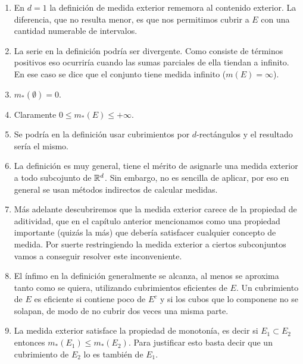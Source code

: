  \begin{observacion}{}
 \begin{enumerate}

 \item En $d=1$ la definición de medida exterior rememora al contenido exterior.   La diferencia, que no resulta menor, es que nos permitimos cubrir a $E$ con  una cantidad numerable de intervalos.
 \item La serie  en la definición podría  ser divergente. Como consiste de términos positivos eso ocurriría cuando las sumas parciales de ella tiendan a infinito. En ese caso se dice que el conjunto tiene medida infinito ($m(E)=\infty$).
 \item $m_*(\emptyset)=0$. 
 \item Claramente $0\leq m_{*}(E)\leq +\infty$. 
     \item Se podría en la definición usar cubrimientos por $d$-rectángulos  y el resultado sería el mismo.
     \item La definición es muy general, tiene el mérito  de asignarle una medida exterior a todo subcojunto de $\mathbb{R}^d$. Sin embargo, no es sencilla de aplicar, por eso en general se usan métodos indirectos de calcular medidas.
     \item Más adelante descubriremos que la medida exterior carece de la  propiedad de aditividad, que en el capítulo anterior mencionamos como una propiedad importante (quizás la más) que debería satisfacer cualquier concepto de medida. Por suerte restringiendo la medida exterior a ciertos subconjuntos vamos a conseguir resolver este inconveniente.
     \item El ínfimo en la definición generalmente se alcanza, al menos se aproxima tanto como se quiera, utilizando cubrimientos eficientes de $E$.  Un cubrimiento de $E$   es eficiente  si contiene poco de $E^c$ y si los cubos que lo componene no se solapan, de modo de no cubrir dos veces una misma parte.
     \item La medida exterior satisface la propiedad de monotonía, es decir si $E_1\subset E_2$ entonces $m_*(E_1)\leq m_*(E_2)$. Para justificar esto basta decir que un cubrimiento de $E_2$ lo es también de $E_1$.
 \end{enumerate}
  \end{observacion}


